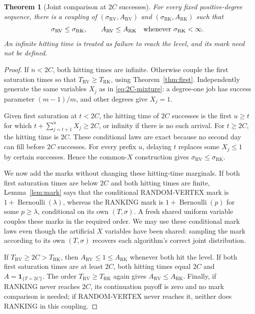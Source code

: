 \documentclass[11pt]{article}
\newtheorem{theorem}{Theorem}
\newcommand{\RV}{\mathrm{RV}}
\newcommand{\RK}{\mathrm{RK}}
\begin{document}
\begin{theorem}[Joint comparison at $2C$ successes]\label{thm:joint}
For every fixed positive-degree sequence, there is a coupling of
$(\sigma_\RV,A_\RV)$ and $(\sigma_\RK,A_\RK)$ such that
\[
 \sigma_\RV\leq\sigma_\RK,
 \qquad A_\RV\leq A_\RK\quad\hbox{whenever }\sigma_\RK<\infty.
\]
An infinite hitting time is treated as failure to reach the level, and
its mark need not be defined.
\end{theorem}
\begin{proof}
If $n<2C$, both hitting times are infinite. Otherwise couple the first
saturation times so that $T_\RV\geq T_\RK$, using
Theorem~\ref{thm:first}. Independently generate the same variables $X_j$
as in \eqref{eq:2C-mixture}: a degree-one job has success parameter
$(m-1)/m$, and other degrees give $X_j=1$.

Given first saturation at $t<2C$, the hitting time of $2C$ successes is
the first $u\geq t$ for which $t+\sum_{j=t+1}^{u}X_j\geq2C$,
or infinity if there is no such arrival. For $t\geq2C$, the hitting
time is $2C$. These conditional laws are exact because no second day can
fill before $2C$ successes. For every prefix $u$, delaying $t$ replaces
some $X_j\leq1$ by certain successes. Hence the common-$X$ construction
gives $\sigma_\RV\leq\sigma_\RK$.

We now add the marks without changing these hitting-time marginals.
If both first saturation times are below $2C$ and both hitting times
are finite, Lemma~\ref{lem:mark} says that the conditional RANDOM-VERTEX
mark is $1+\operatorname{Bernoulli}(\lambda)$, whereas the RANKING mark
is $1+\operatorname{Bernoulli}(p)$ for some $p\geq\lambda$, conditional
on its own $(T,\sigma)$. A fresh shared uniform variable couples these
marks in the required order. We may use these conditional mark laws
even though the artificial $X$ variables have been shared: sampling the
mark according to its own $(T,\sigma)$ recovers each algorithm's correct
joint distribution.

If $T_\RV\geq2C>T_\RK$, then $A_\RV\leq1\leq A_\RK$ whenever
both hit the level. If both first saturation times are at least $2C$,
both hitting times equal $2C$ and
$A=\mathbf1_{\{T=2C\}}$. The order $T_\RV\geq T_\RK$ again gives
$A_\RV\leq A_\RK$. Finally, if RANKING never reaches $2C$, its
continuation payoff is zero and no mark comparison is needed; if
RANDOM-VERTEX never reaches it, neither does RANKING in this coupling.
\end{proof}
\end{document}
